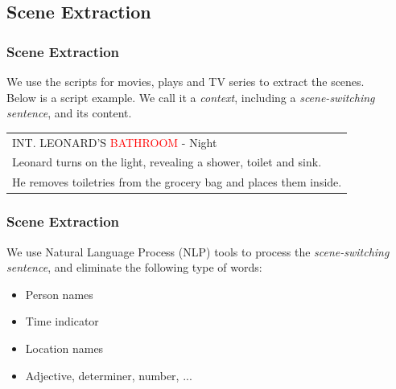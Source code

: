 \documentclass[xcolor=table,slidestop,compress,mathserif]{beamer}
\begin{document}
\subsection{Scene Extraction}
\begin{frame}
	\frametitle{Scene Extraction}	
	We use the scripts for movies, plays and TV series to extract the scenes. \\ 
	Below is a script example. 
	We call it a \textit{context}, including a \textit{scene-switching sentence}, and its content. 
	\begin{table}[h]
		\begin{tabular}{|l|}
		\hline
		INT. LEONARD'S \textcolor{red}{BATHROOM} - Night \\ 
		Leonard turns on the light, revealing a shower, toilet and sink.\\
		He removes toiletries from the grocery bag and places them inside. \\ 
		\hline
		\end{tabular}
	\end{table}
\end{frame}
\begin{frame}
	\frametitle{Scene Extraction}
	We use Natural Language Process (NLP) tools to process the \textit{scene-switching sentence}, and eliminate the following type of words: \\ 
	\begin{itemize}
		\item{Person names} 
		\item{Time indicator}
		\item{Location names}
		\item{Adjective, determiner, number, ...}
	\end{itemize}

	\begin{table}[htb]
	\centering
	\caption{Top 10 Occurred Scenes}
	\end{table}
\end{frame}
\end{document}
